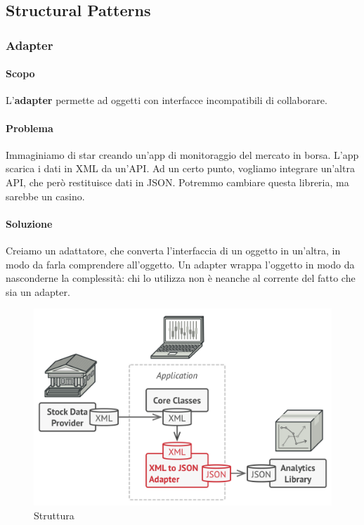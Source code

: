 \documentclass[11pt]{article}
\begin{document}
\subsection{Structural Patterns}
\subsubsection{Adapter}
\paragraph{Scopo}
L'\textbf{adapter} permette ad oggetti con interfacce incompatibili di collaborare.

\paragraph{Problema}
Immaginiamo di star creando un'app di monitoraggio del mercato in borsa. L'app scarica i dati in XML da un'API. Ad un certo punto, vogliamo integrare un'altra API, che però restituisce dati in JSON. Potremmo cambiare questa libreria, ma sarebbe un casino. 
\paragraph{Soluzione}
Creiamo un adattatore, che converta l'interfaccia di un oggetto in un'altra, in modo da farla comprendere all'oggetto. Un adapter wrappa l'oggetto in modo da nasconderne la complessità: chi lo utilizza non è neanche al corrente del fatto che sia un adapter. 
\begin{figure}[H]
    \centering
    \includegraphics[width=\linewidth]{res/teoria/Adapter.png}
    \caption{Struttura}
\end{figure}
\end{document}
